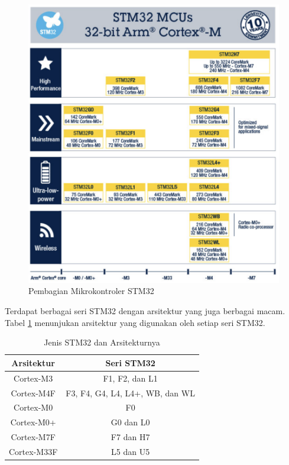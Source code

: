 \begin{figure}[ht]
	\centering
	\includegraphics[width=12cm]{contents/chapter-2/stm-32-groups.png}
	\caption{Pembagian Mikrokontroler STM32 \cite{STMicroelectronics2023}}
	\label{Fig: stm32-groups}
\end{figure}

Terdapat berbagai seri STM32 dengan arsitektur yang juga berbagai macam. Tabel \ref{Tab: stm-arch-table} menunjukan arsitektur yang digunakan oleh setiap seri STM32.

\begin{table}[H]
	\caption{Jenis STM32 dan Arsitekturnya}
	\vspace{0.5em}
	\centering
	\begin{tabular}{cc}
		\hline
		\textbf{Arsitektur} & \textbf{Seri STM32} \\
		\hline 
		Cortex-M3 & F1, F2, dan L1\\
		Cortex-M4F & F3, F4, G4, L4, L4+, WB, dan WL\\
		Cortex-M0 & F0\\ 
		Cortex-M0+ & G0 dan L0\\
		Cortex-M7F & F7 dan H7\\ 
		Cortex-M33F & L5 dan U5\\ \hline
	\end{tabular}
	\label{Tab: stm-arch-table}
\end{table}

